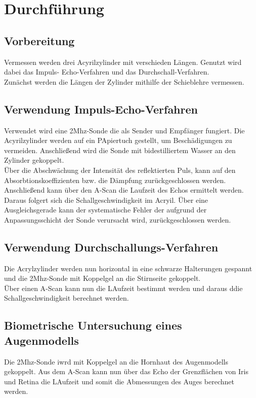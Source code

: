 \section{Durchführung}
\label{sec:Durchfuehrung}
\subsection{Vorbereitung}
Vermessen werden drei Acyrilzylinder mit verschieden Längen. Genutzt wird dabei das Impuls-
Echo-Verfahren und das Durchschall-Verfahren.\\
Zunächst werden die Längen der Zylinder mithilfe der Schieblehre vermessen.
\subsection{Verwendung Impuls-Echo-Verfahren}
Verwendet wird eine 2Mhz-Sonde die als Sender und Empfänger fungiert.
Die Acyrilzylinder werden auf ein PApiertuch gestellt, um Beschädigungen zu vermeiden.
Anschließend wird die Sonde mit bidestilliertem Wasser an den Zylinder gekoppelt.\\

Über die Abschwächung der Intensität des reflektierten Puls, kann auf den Absorbtionskoeffizienten bzw.
die Dämpfung zurückgeschlossen werden.\\
Anschließend kann über den A-Scan die Laufzeit des Echos ermittelt werden. 
Daraus folgert sich die Schallgeschwindigkeit im Acryil.
Über eine Ausgleichsgerade kann der systematische Fehler der aufgrund der Anpassungsschicht der Sonde verursacht wird,
zurückgeschlossen werden.
\subsection{Verwendung Durchschallungs-Verfahren}
Die Acrylzylinder werden nun horizontal in eine schwarze Halterungen gespannt und 
die 2Mhz-Sonde mit Koppelgel an die Stirnseite gekoppelt.\\
Über einen A-Scan kann nun die LAufzeit bestimmt werden und daraus ddie Schallgeschwindigkeit berechnet werden.
\subsection{Biometrische Untersuchung eines Augenmodells}
Die 2Mhz-Sonde iwrd mit Koppelgel an die Hornhaut des Augenmodells gekoppelt.
Aus dem A-Scan kann nun über das Echo der Grenzflächen von Iris und Retina die LAufzeit und 
somit die Abmessungen des Auges berechnet werden. 

